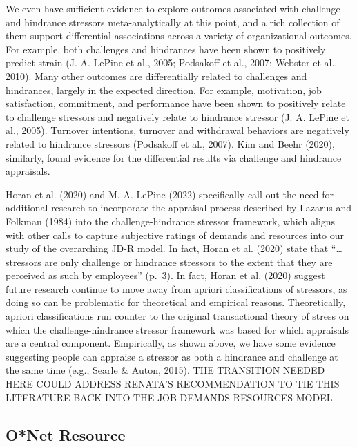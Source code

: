 \documentclass[
  man]{apa6}
\begin{document}
We even have sufficient evidence to explore outcomes associated with challenge and hindrance stressors meta-analytically at this point, and a rich collection of them support differential associations across a variety of organizational outcomes. For example, both challenges and hindrances have been shown to positively predict strain (J. A. LePine et al., 2005; Podsakoff et al., 2007; Webster et al., 2010). Many other outcomes are differentially related to challenges and hindrances, largely in the expected direction. For example, motivation, job satisfaction, commitment, and performance have been shown to positively relate to challenge stressors and negatively relate to hindrance stressor (J. A. LePine et al., 2005). Turnover intentions, turnover and withdrawal behaviors are negatively related to hindrance stressors (Podsakoff et al., 2007). Kim and Beehr (2020), similarly, found evidence for the differential results via challenge and hindrance appraisals.

Horan et al. (2020) and M. A. LePine (2022) specifically call out the need for additional research to incorporate the appraisal process described by Lazarus and Folkman (1984) into the challenge-hindrance stressor framework, which aligns with other calls to capture subjective ratings of demands and resources into our study of the overarching JD-R model. In fact, Horan et al. (2020) state that ``\ldots stressors are only challenge or hindrance stressors to the extent that they are perceived as such by employees'' (p.~3). In fact, Horan et al. (2020) suggest future research continue to move away from apriori classifications of stressors, as doing so can be problematic for theoretical and empirical reasons. Theoretically, apriori classifications run counter to the original transactional theory of stress on which the challenge-hindrance stressor framework was based for which appraisals are a central component. Empirically, as shown above, we have some evidence suggesting people can appraise a stressor as both a hindrance and challenge at the same time (e.g., Searle \& Auton, 2015). THE TRANSITION NEEDED HERE COULD ADDRESS RENATA'S RECOMMENDATION TO TIE THIS LITERATURE BACK INTO THE JOB-DEMANDS RESOURCES MODEL.

\hypertarget{onet-resource}{%
\subsection{O*Net Resource}\label{onet-resource}}
\end{document}
